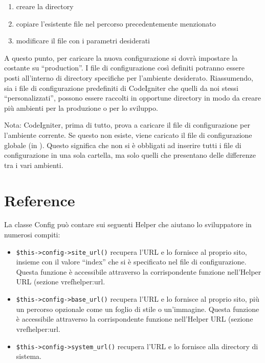 \begin{enumerate}
\item creare la directory 
\item copiare l'esistente file  nel percorso precedentemente menzionato
\item modificare il file  con i parametri desiderati
\end{enumerate}

A questo punto, per caricare la nuova configurazione si dovrà impostare la costante  su ``production''. I file di configurazione così definiti potranno essere posti all'interno di directory specifiche per l'ambiente desiderato. Riassumendo, sia i file di configurazione predefiniti di CodeIgniter che quelli da noi stessi ``personalizzati'', possono essere raccolti in opportune directory in modo da creare più ambienti per la produzione o per lo sviluppo.

Nota: CodeIgniter, prima di tutto, prova a caricare il file di configurazione per l'ambiente corrente. Se questo non esiste, viene caricato il file di configurazione globale (in ). Questo significa che non si è obbligati ad inserire tutti i file di configurazione in una sola cartella, ma solo quelli che presentano delle differenze tra i vari ambienti.

\section*{Reference}
La classe Config può contare sui seguenti Helper che aiutano lo sviluppatore in numerosi compiti:

\begin{itemize}
\item \verb|$this->config->site_url()| recupera l'\ac{URL} e lo fornisce al proprio sito, insieme con il valore ``index'' che si è specificato nel file di configurazione. Questa funzione è accessibile attraverso la corrispondente funzione nell'Helper URL (sezione vref{helper:url}.

\item \verb|$this->config->base_url()| recupera l'\ac{URL} e lo fornisce al proprio sito, più un percorso opzionale come un foglio di stile o un'immagine. Questa funzione è accessibile attraverso la corrispondente funzione nell'Helper URL (sezione vref{helper:url}.

\item \verb|$this->config->system_url()| recupera l'\ac{URL} e lo fornisce alla directory di sistema.
\end{itemize}